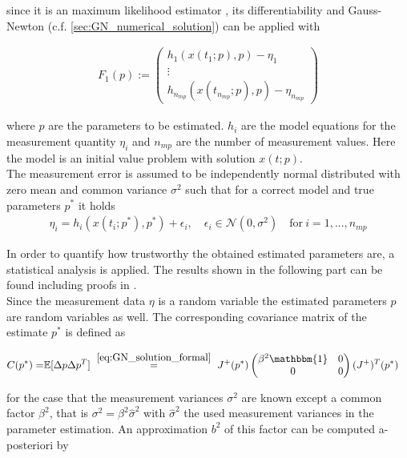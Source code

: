 \documentclass{scrartcl}[12pt, halfparskip]
\numberwithin{equation}{section}
\numberwithin{figure}{section}
\numberwithin{table}{section}
\begin{document}
since it is an maximum likelihood estimator \cite{disseration_andreas_sommer}, its differentiability and Gauss-Newton (c.f. \cref{sec:GN_numerical_solution}) can be applied with

\begin{align}
F_1(p) := 
\begin{pmatrix}
h_1(x(t_1;p),p) - \eta_1 \\
\vdots \\
h_{n_{mp}}(x(t_{n_{mp}};p),p) - \eta_{n_{mp}}
\end{pmatrix}
\end{align}

where $p$ are the parameters to be estimated. $h_i$ are the model equations for the measurement quantity $\eta_i$ and $n_{mp}$ are the number of measurement values. Here the model is an initial value problem with solution $x(t;p)$. \\
The measurement error is assumed to be independently normal distributed with zero mean and common variance $\sigma^2$ such that for a correct model and true parameters $p^*$ it holds
\begin{align}
	\eta_i = h_i(x(t_i;p^*),p^*) + \epsilon_i, \quad \epsilon_i \in \mathcal{N}(0,\sigma^2) \quad \text{for} \ i=1,...,n_{mp}
\end{align}


In order to quantify how trustworthy the obtained estimated parameters are, a statistical analysis is applied. The results shown in the following part can be found including proofs in \cite{diss_bock}. \\

Since the measurement data $\eta$ is a random variable the estimated parameters $p$ are random variables as well. The corresponding covariance matrix of the estimate $p^*$ is defined as

\begin{align}
	C(p^*) = & \mathbb{E} [ \Delta p \Delta p^T ]
	\ \stackrel{\cref{eq:GN_solution_formal}}{=} \ J^+(p^*)
	\begin{pmatrix}
	\beta^2  \mathbbm{1} & 0 \\
	0 & 0
	\end{pmatrix}
	(J^+)^T(p^*) 
	\label{eq:stat_ana_covariance_matrix}
\end{align}

for the case that the measurement variances $\sigma^2$ are known except a common factor $\beta^2$, that is $\sigma^2 = \beta^2 \hat{\sigma}^2$ with $\hat{\sigma}^2$ the used measurement variances in the parameter estimation. An approximation $b^2$ of this factor can be computed a-posteriori by
\end{document}
